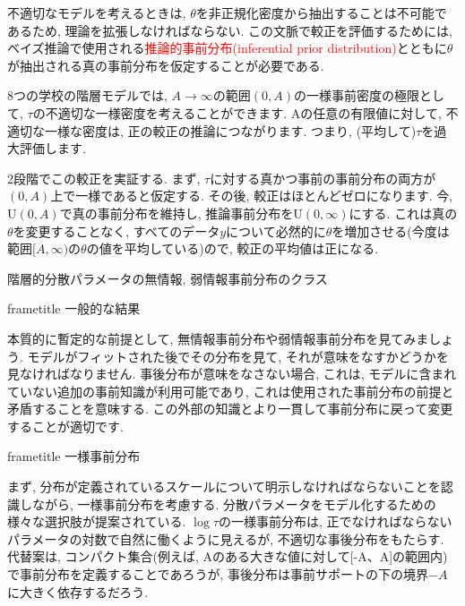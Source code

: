 \documentclass[10pt,dvipdfmx,a4]{beamer}
\newcommand{\dbox}[1]{\begin{beamercolorbox}[wd=122mm, sep=0pt, shadow=false, rounded=false]{frametitle} { #1}\end{beamercolorbox}}
\newcommand{\tcr}[1]{\textcolor{red}{#1}}
\begin{document}
\begin{frame}
不適切なモデルを考えるときは, $\theta$を非正規化密度から抽出することは不可能であるため, 理論を拡張しなければならない.
この文脈で較正を評価するためには, ベイズ推論で使用される\tcr{推論的事前分布(inferential prior distribution)}とともに$\theta$が抽出される真の事前分布を仮定することが必要である.

8つの学校の階層モデルでは, $A\rightarrow\infty$の範囲$(0, A)$の一様事前密度の極限として, $\tau$の不適切な一様密度を考えることができます.
Aの任意の有限値に対して, 不適切な一様な密度は, 正の較正の推論につながります.
つまり, (平均して)$\tau$を過大評価します.

2段階でこの較正を実証する.
まず, $\tau$に対する真かつ事前の事前分布の両方が$(0, A)$上で一様であると仮定する.
その後, 較正はほとんどゼロになります.
今, $\text{U}(0, A)$で真の事前分布を維持し, 推論事前分布を$\text{U}(0, \infty)$にする.
これは真の$\theta$を変更することなく, すべてのデータ$y$について必然的に$\theta$を増加させる(今度は範囲$[A, \infty)$の$\theta$の値を平均している)ので, 較正の平均値は正になる.
\end{frame}


\begin{frame}{階層的分散パラメータの無情報, 弱情報事前分布のクラス}
\dbox{一般的な結果}
本質的に暫定的な前提として, 無情報事前分布や弱情報事前分布を見てみましょう.
モデルがフィットされた後でその分布を見て, それが意味をなすかどうかを見なければなりません.
事後分布が意味をなさない場合, これは, モデルに含まれていない追加の事前知識が利用可能であり, これは使用された事前分布の前提と矛盾することを意味する.
この外部の知識とより一貫して事前分布に戻って変更することが適切です.

\dbox{一様事前分布}
まず, 分布が定義されているスケールについて明示しなければならないことを認識しながら, 一様事前分布を考慮する.
分散パラメータをモデル化するための様々な選択肢が提案されている.
$\log\tau$の一様事前分布は, 正でなければならないパラメータの対数で自然に働くように見えるが, 不適切な事後分布をもたらす.
代替案は, コンパクト集合(例えば, Aのある大きな値に対して[-A、A]の範囲内)で事前分布を定義することであろうが, 事後分布は事前サポートの下の境界$-A$に大きく依存するだろう.
\end{frame}

\end{document}
